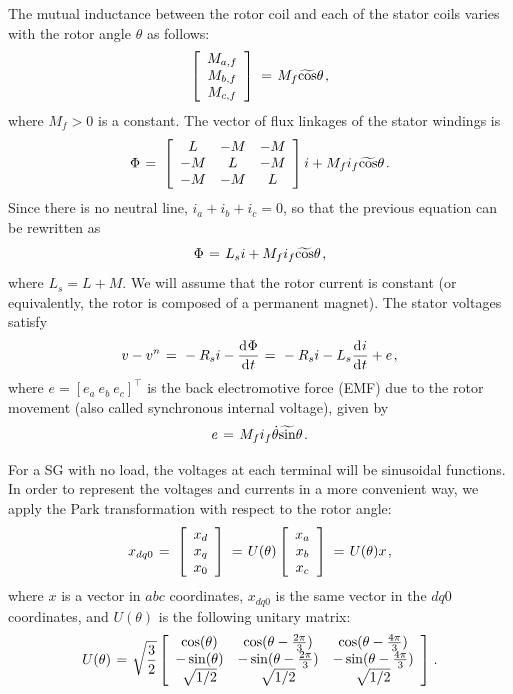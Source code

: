 \documentclass[letterpaper, 10 pt, conference]{ieeeconf}  %
\newcommand{\BE}{\begin{equation}}
\newcommand{\BEQ}[1]{\BE\label{#1}} %
\newcommand{\m}      {{\hbox{\hskip 1pt}}}
\newcommand{\dd}     {{\rm d\hbox{\hskip 0.5pt}}}
\begin{document}
The mutual inductance between the rotor coil and each of the stator
coils varies with the rotor angle $\theta$ as follows:
$$ \left[\begin{array}{c} M_{a,f}\\ M_{b,f}\\ M_{c,f}\end{array}
   \right] \m=\m M_{f}\widetilde{\cos}\theta \m,$$
where $M_f>0$ is a constant. The vector of flux linkages of the stator
windings is
$$ \Phi \m=\m \left[\begin{array}{ccc} L & -M & -M\\ -M & L & -M\\
   -M & -M & L \end{array}\right]i + M_f i_f\widetilde{\cos}\theta
   \m.$$
Since there is no neutral line, $i_a+i_b+i_c=0$, so that the previous
equation can be rewritten as 
$$\Phi \m=\m L_s i + M_f i_f \widetilde{\cos}\theta \m,$$
where $L_s=L+M$. We will assume that the rotor current is constant
(or equivalently, the rotor is composed of a permanent magnet). The
stator voltages satisfy
\BEQ{eq:SGTerminalVlotage}
   v - v^n \m=\m -R_{s}i-\frac{\dd\Phi}{\dd t} \m=\m -R_{s}i-L_{s}
   \frac{\dd i}{\dd t} + e \m,
\end{equation}
where $e=\left[e_a\ e_b\ e_c \right] ^\top$ is the back electromotive 
force (EMF) due to the rotor movement (also called synchronous 
internal voltage), given by \vspace{-2mm}
\BEQ{eq:emf}
   e \m=\m M_f i_f\dot{\theta}\widetilde{\sin}\theta \m.
\end{equation}

For a SG with no load, the voltages at each terminal
will be sinusoidal functions. In order to represent the voltages and
currents in a more convenient way, we apply the Park transformation
with respect to the rotor angle:
$$ x_{dq0} \m=\m \left[\begin{array}{c} x_{d}\\ x_{q}\\ x_{0}
   \end{array}\right] \m=\m U(\theta) \left[\begin{array}{c} x_{a}\\
   x_b\\ x_c\end{array}\right] \m=\m U(\theta) x \m,$$
where $x$ is a vector in $abc$ coordinates, $x_{dq0}$
is the same vector in the $dq0$ coordinates, and $U(\theta)$ is the
following unitary matrix:
$$
 U(\theta) \m=\m \sqrt{\frac{3}{2}}\left[\begin{array}{ccc}
   \cos(\theta) & \cos(\theta-\frac{2\pi}{3}) & \cos(\theta-
   \frac{4\pi}{3})\\ -\sin(\theta) & -\sin(\theta-\frac{2\pi}{3})
   & -\sin(\theta-\frac{4\pi}{3})\\ \sqrt{1/2} & \sqrt{1/2} & 
   \sqrt{1/2} \end{array}\right] \m.
$$
\end{document}
